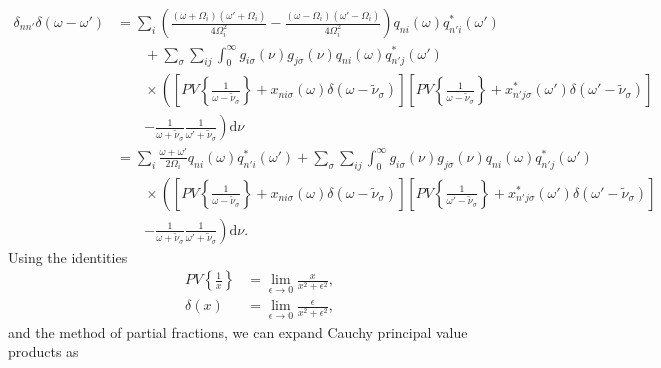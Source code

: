 \begin{equation}
\begin{split}
\delta_{nn'}\delta(\omega - \omega') 
&= \sum_i\left(\frac{(\omega + \Omega_i)(\omega' + \Omega_i)}{4\Omega_i^2} - \frac{(\omega - \Omega_i)(\omega' - \Omega_i)}{4\Omega_i^2}\right)q_{ni}(\omega)q_{n'i}^*(\omega')\\
&\qquad + \sum_\sigma\sum_{ij}\int_0^\infty g_{i\sigma}(\nu)g_{j\sigma}(\nu)q_{ni}(\omega)q_{n'j}^*(\omega')\\
&\qquad\times \left(\left[PV\left\{\frac{1}{\omega - \tilde{\nu}_\sigma}\right\} + x_{ni\sigma}(\omega)\delta(\omega - \tilde{\nu}_\sigma)\right]\left[PV\left\{\frac{1}{\omega - \tilde{\nu}_\sigma}\right\} + x_{n'j\sigma}^*(\omega')\delta(\omega' - \tilde{\nu}_\sigma)\right]\right.\\
&\qquad\left. - \frac{1}{\omega + \tilde{\nu}_\sigma}\frac{1}{\omega' + \tilde{\nu}_\sigma} \right)\mathrm{d}\nu\\
&= \sum_i\frac{\omega + \omega'}{2\Omega_i}q_{ni}(\omega)q_{n'i}^*(\omega') + \sum_\sigma\sum_{ij}\int_0^\infty g_{i\sigma}(\nu)g_{j\sigma}(\nu)q_{ni}(\omega)q_{n'j}^*(\omega')\\
&\qquad\times\left(\left[PV\left\{\frac{1}{\omega - \tilde{\nu}_\sigma}\right\} + x_{ni\sigma}(\omega)\delta(\omega - \tilde{\nu}_\sigma)\right]\left[PV\left\{\frac{1}{\omega' - \tilde{\nu}_\sigma}\right\} + x_{n'j\sigma}^*(\omega')\delta(\omega' - \tilde{\nu}_\sigma)\right]\right.\\
&\qquad\left. - \frac{1}{\omega + \tilde{\nu}_\sigma}\frac{1}{\omega' + \tilde{\nu}_\sigma} \right)\mathrm{d}\nu.
\end{split}
\end{equation}
Using the identities
\begin{equation}
\begin{split}
PV\left\{\frac{1}{x}\right\} &= \lim_{\epsilon\to0}\frac{x}{x^2 + \epsilon^2},\\
\delta(x) &= \lim_{\epsilon\to0}\frac{\epsilon}{x^2 + \epsilon^2},
\end{split}
\end{equation}
and the method of partial fractions, we can expand Cauchy principal value products as
